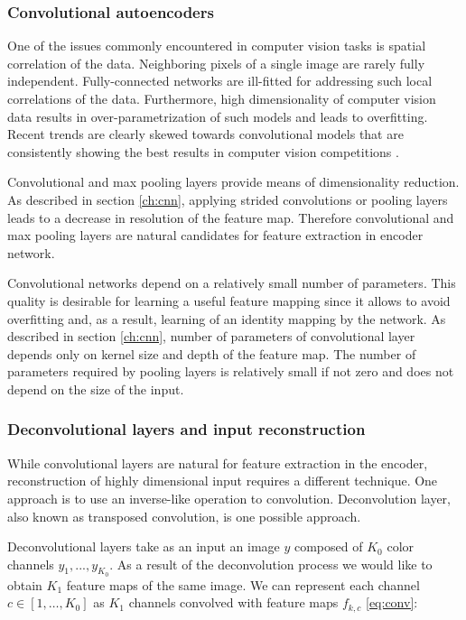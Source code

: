 \subsubsection{Convolutional autoencoders}\label{ch:cae}

One of the issues commonly encountered in computer vision tasks is spatial correlation of the data.
Neighboring pixels of a single image are rarely fully independent.
Fully-connected networks are ill-fitted for addressing such local correlations of the data.
Furthermore, high dimensionality of computer vision data results in over-parametrization of such models and leads to overfitting.
Recent trends are clearly skewed towards convolutional models \cite{He2015, Szegedy2016} that are consistently showing the best results in computer vision competitions \cite{ILSVRC15, Zhou2016}.

Convolutional and max pooling layers provide means of dimensionality reduction.
As described in section \ref{ch:cnn}, applying strided convolutions or pooling layers leads to a decrease in resolution of the feature map.
Therefore convolutional and max pooling layers are natural candidates for feature extraction in encoder network.

Convolutional networks depend on a relatively small number of parameters.
This quality is desirable for learning a useful feature mapping since it allows to avoid overfitting and, as a result, learning of an identity mapping by the network.
As described in section \ref{ch:cnn}, number of parameters of convolutional layer depends only on kernel size and depth of the feature map.
The number of parameters required by pooling layers is relatively small if not zero and does not depend on the size of the input.

\subsubsection{Deconvolutional layers and input reconstruction} \label{ch:tcnn}

While convolutional layers are natural for feature extraction in the encoder, reconstruction of highly dimensional input requires a different technique.
One approach is to use an inverse-like operation to convolution.
Deconvolution layer, also known as transposed convolution, is one possible approach.

Deconvolutional layers \cite{Zeiler2010} take as an input an image $y$ composed of $K_0$ color channels $y_1, ... , y_{K_0}$.
As a result of the deconvolution process we would like to obtain $K_1$ feature maps of the same image.
We can represent each channel $c \in [1, \ldots, K_0]$ as $K_1$ channels convolved with feature maps $f_{k,c}$ \ref{eq:conv}:

